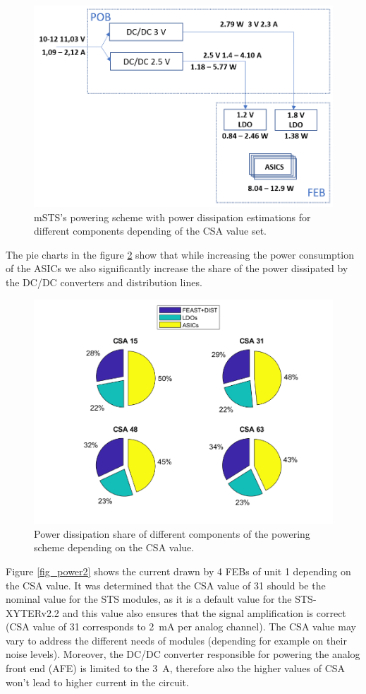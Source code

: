  
\begin{figure}[h!]
\centering
\includegraphics[width=0.65\columnwidth]{Chapter6/DCS/images/POB.png}
\caption{mSTS's powering scheme with power dissipation estimations for different components depending of the \gls{CSA} value set.}
\label{fig_power_scheme}
\end{figure}


The pie charts in the figure \ref{fig_power_CSA} show that while increasing the power consumption of the \gls{ASIC}s we also significantly increase the share of the power dissipated by the DC/DC converters and distribution lines. %
\newpage
\begin{figure}[h!]
\centering
\includegraphics[width=0.7\columnwidth]{Chapter6/DCS/images/POBpie.png}
\caption{Power dissipation share of different components of the powering scheme depending on the \gls{CSA} value.}
\label{fig_power_CSA}
\end{figure}
Figure \ref{fig_power2} shows the current drawn by 4 \glspl{FEB} of unit 1 depending on the \gls{CSA} value. It was determined that the \gls{CSA} value of 31 should be the nominal value for the \gls{STS} modules, as it is a default value for the STS-XYTERv2.2 and this value also ensures that the signal amplification is correct (\gls{CSA} value of 31 corresponds to 2~mA per analog channel). The \gls{CSA} value may vary to address the different needs of modules (depending for example on their noise levels).  Moreover, the DC/DC converter responsible for powering the analog front end (\gls{AFE}) is limited to the 3~A, therefore also the higher values of \gls{CSA} won't lead to higher current in the circuit.

